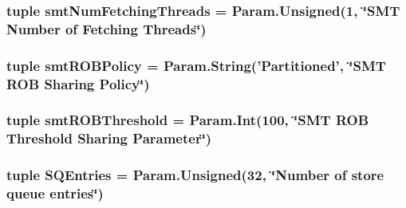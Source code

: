 \label{classO3CPU_1_1DerivO3CPU_a7f52774912af5111096695b4fe368e00}
\hypertarget{classO3CPU_1_1DerivO3CPU_a49914e72e327c9059bed92c4095a120f}{
\subsubsection[{smtNumFetchingThreads}]{\setlength{\rightskip}{0pt plus 5cm}tuple {\bf smtNumFetchingThreads} = Param.Unsigned(1, \char`\"{}SMT Number of Fetching Threads\char`\"{})}}
\label{classO3CPU_1_1DerivO3CPU_a49914e72e327c9059bed92c4095a120f}
\hypertarget{classO3CPU_1_1DerivO3CPU_a70c4adeb48862e8ac639815b506c3b3d}{
\subsubsection[{smtROBPolicy}]{\setlength{\rightskip}{0pt plus 5cm}tuple {\bf smtROBPolicy} = Param.String('Partitioned', \char`\"{}SMT {\bf ROB} Sharing Policy\char`\"{})}}
\label{classO3CPU_1_1DerivO3CPU_a70c4adeb48862e8ac639815b506c3b3d}
\hypertarget{classO3CPU_1_1DerivO3CPU_ab9a64d632e45630d1caeb00b91723a9e}{
\subsubsection[{smtROBThreshold}]{\setlength{\rightskip}{0pt plus 5cm}tuple {\bf smtROBThreshold} = Param.Int(100, \char`\"{}SMT {\bf ROB} Threshold Sharing Parameter\char`\"{})}}
\label{classO3CPU_1_1DerivO3CPU_ab9a64d632e45630d1caeb00b91723a9e}
\hypertarget{classO3CPU_1_1DerivO3CPU_a910857438278a89a287832cf7087317b}{
\subsubsection[{SQEntries}]{\setlength{\rightskip}{0pt plus 5cm}tuple {\bf SQEntries} = Param.Unsigned(32, \char`\"{}Number of store queue entries\char`\"{})}}
